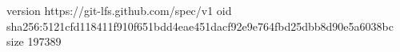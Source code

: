 version https://git-lfs.github.com/spec/v1
oid sha256:5121cfd118411f910f651bdd4eae451dacf92e9e764fbd25dbb8d90e5a6038bc
size 197389
